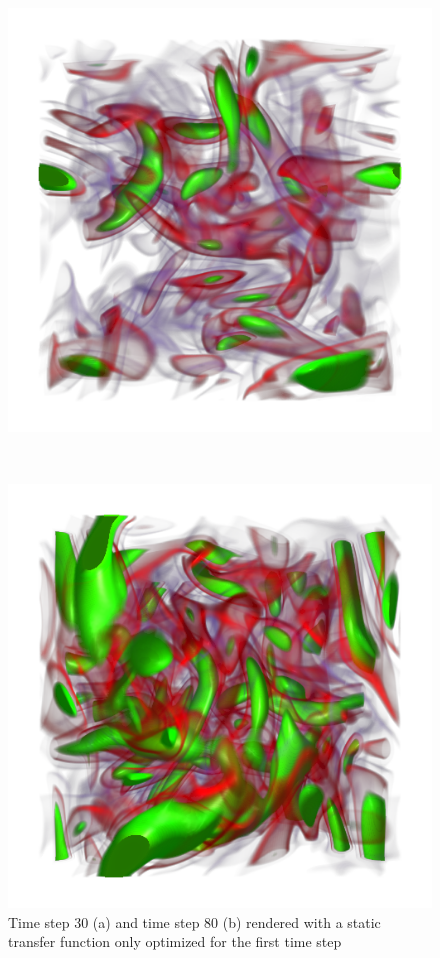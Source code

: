 \begin{figure}
	\centering
	\begin{minipage}{.5\textwidth}
		\includegraphics[width=1\linewidth]{images/vorts30_static}
		\subcaption{}
	\end{minipage}~
	\begin{minipage}{.5\textwidth}
		\includegraphics[width=1\linewidth]{images/vorts80_static}
		\subcaption{}
	\end{minipage}
	\caption{Time step 30 (a) and time step 80 (b) rendered with a static transfer function only optimized for the first time step}
	\label{fig:vorts_50_80_static}
\end{figure}

